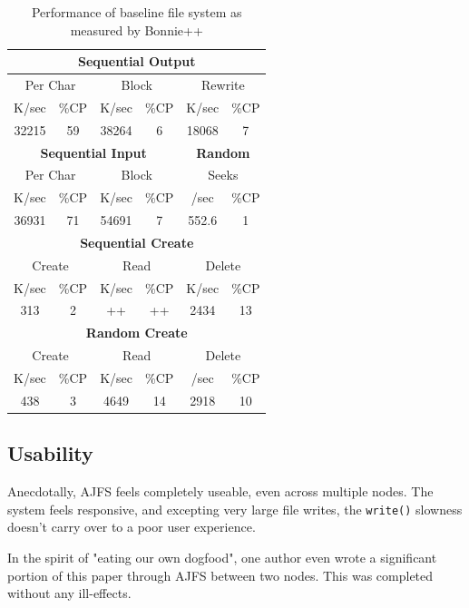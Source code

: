 \begin{table}[Ht]
\centering
\begin{tabular}{| c | c | c | c | c | c |}
\hline
\multicolumn{6}{|c|}{\bf Sequential Output}\\
\hline
\multicolumn{2}{|c|}{Per Char} &
\multicolumn{2}{c|}{Block} &
\multicolumn{2}{c|}{Rewrite} \\
\hline
K/sec & \%CP & K/sec & \%CP & K/sec & \%CP \\
\hline
32215 & 59 & 38264 & 6 & 18068 & 7 \\
\hline

\multicolumn{4}{|c|}{\bf Sequential Input} & \multicolumn{2}{c|}{\bf Random}\\
\hline
\multicolumn{2}{|c|}{Per Char} &
\multicolumn{2}{c|}{Block} &
\multicolumn{2}{c|}{Seeks} \\
\hline
K/sec & \%CP & K/sec & \%CP & /sec & \%CP \\
\hline
36931 & 71 & 54691 & 7 & 552.6 & 1 \\
\hline

\multicolumn{6}{|c|}{\bf Sequential Create}\\
\hline
\multicolumn{2}{|c|}{Create} &
\multicolumn{2}{c|}{Read} &
\multicolumn{2}{c|}{Delete} \\
\hline
K/sec & \%CP & K/sec & \%CP & K/sec & \%CP \\
\hline
  313 & 2 & ++ & ++ & 2434 & 13 \\
\hline

\multicolumn{6}{|c|}{\bf Random Create}\\
\hline
\multicolumn{2}{|c|}{Create} &
\multicolumn{2}{c|}{Read} &
\multicolumn{2}{c|}{Delete} \\
\hline
K/sec & \%CP & K/sec & \%CP & /sec & \%CP \\
\hline
  438 & 3 & 4649 & 14 & 2918 & 10 \\
\hline
\end{tabular}
\caption{Performance of baseline file system as measured by Bonnie++}
\label{tab:bonnie-nfs}
\end{table}

\subsection{Usability}

Anecdotally, AJFS feels completely useable, even across multiple nodes. The
system feels responsive, and excepting very large file writes, the
\texttt{write()} slowness doesn't carry over to a poor user experience.

In the spirit of "eating our own dogfood", one author even wrote a significant
portion of this paper through AJFS between two nodes. This was completed without
any ill-effects.

